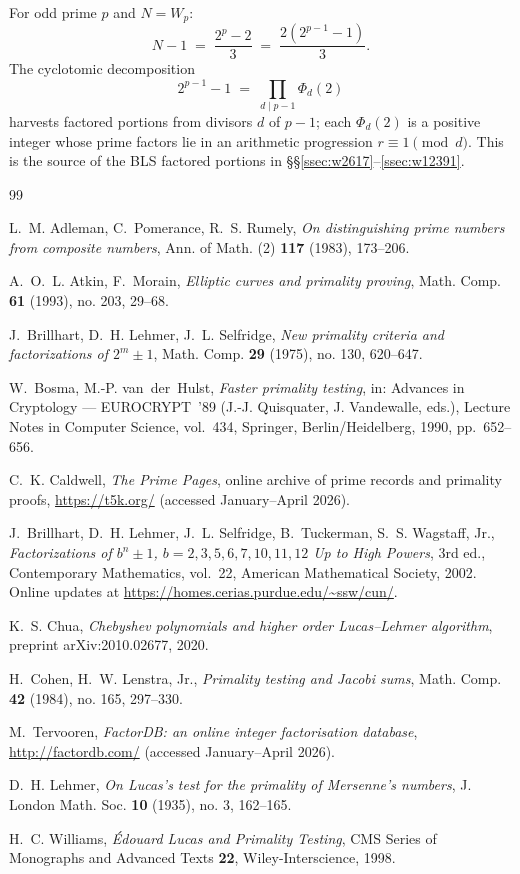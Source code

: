 \documentclass[11pt,a4paper]{amsart}
\theoremstyle{plain}
\theoremstyle{definition}
\begin{document}
For odd prime $p$ and $N = W_p$:
\[
  N - 1 \;=\; \frac{2^p - 2}{3} \;=\; \frac{2(2^{p-1} - 1)}{3}.
\]
The cyclotomic decomposition
\[
  2^{p-1} - 1 \;=\; \prod_{d \mid p-1} \Phi_d(2)
\]
harvests factored portions from divisors $d$ of $p - 1$; each
$\Phi_d(2)$ is a positive integer whose prime factors lie in an
arithmetic progression $r \equiv 1 \pmod d$. This is the source of
the BLS factored portions in
\S\S\ref{ssec:w2617}--\ref{ssec:w12391}.

\begin{thebibliography}{99}

L.~M. Adleman, C.~Pomerance, R.~S. Rumely,
\emph{On distinguishing prime numbers from composite numbers},
Ann. of Math. (2) \textbf{117} (1983), 173--206.

A.~O.~L. Atkin, F.~Morain,
\emph{Elliptic curves and primality proving},
Math. Comp. \textbf{61} (1993), no. 203, 29--68.

J.~Brillhart, D.~H. Lehmer, J.~L. Selfridge,
\emph{New primality criteria and factorizations of $2^m \pm 1$},
Math. Comp. \textbf{29} (1975), no. 130, 620--647.

W.~Bosma, M.-P. van~der~Hulst,
\emph{Faster primality testing},
in: Advances in Cryptology --- EUROCRYPT~'89 (J.-J. Quisquater, J.
Vandewalle, eds.), Lecture Notes in Computer Science, vol.~434,
Springer, Berlin/Heidelberg, 1990, pp.~652--656.

C.~K. Caldwell,
\emph{The Prime Pages},
online archive of prime records and primality proofs,
\url{https://t5k.org/} (accessed January--April 2026).

J.~Brillhart, D.~H. Lehmer, J.~L. Selfridge, B.~Tuckerman, S.~S. Wagstaff, Jr.,
\emph{Factorizations of $b^n \pm 1$, $b = 2, 3, 5, 6, 7, 10, 11, 12$ Up to
High Powers}, 3rd ed., Contemporary Mathematics, vol.~22,
American Mathematical Society, 2002. Online updates at
\url{https://homes.cerias.purdue.edu/~ssw/cun/}.

K.~S. Chua,
\emph{Chebyshev polynomials and higher order Lucas--Lehmer algorithm},
preprint arXiv:2010.02677, 2020.

H.~Cohen, H.~W. Lenstra, Jr.,
\emph{Primality testing and Jacobi sums},
Math. Comp. \textbf{42} (1984), no. 165, 297--330.

M.~Tervooren,
\emph{FactorDB: an online integer factorisation database},
\url{http://factordb.com/} (accessed January--April 2026).

D.~H. Lehmer,
\emph{On Lucas's test for the primality of Mersenne's numbers},
J. London Math. Soc. \textbf{10} (1935), no. 3, 162--165.

H.~C. Williams,
\emph{\'Edouard Lucas and Primality Testing},
CMS Series of Monographs and Advanced Texts \textbf{22},
Wiley-Interscience, 1998.

\end{thebibliography}
\end{document}
